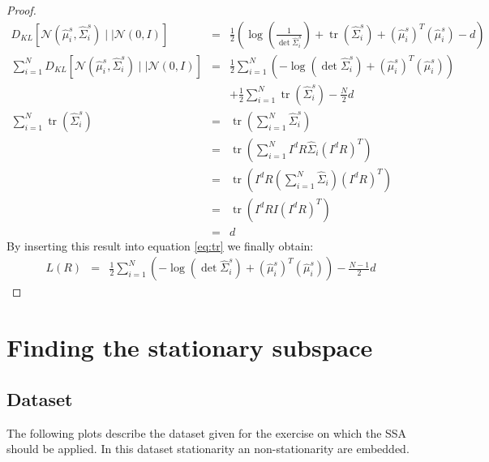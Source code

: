 \documentclass[a4paper, 12pt, titlepage]{article}
\DeclareMathOperator{\tr}{tr}
\begin{document}
\begin{proof}
	\begin{eqnarray}
		D_{KL}\left[\mathcal{N}(\hat{ \mu}_i^{s}, \hat{ \Sigma}_i^s )\mid \mid \mathcal{N}(0, I) \right] &=& \frac{1}{2} \left(\log\left( \frac{1}{\det \hat{ \Sigma}_i^s} \right) + \tr(\hat\Sigma_i^s) + (\hat\mu_i^s)^T(\hat\mu_i^s) - d \right)\\
		 \sum_{i=1}^N D_{KL}\left[\mathcal{N}(\hat{ \mu}_i^{s}, \hat{ \Sigma}_i^s )\mid \mid \mathcal{N}(0, I) \right] &=& \frac{1}{2}\sum_{i=1}^{N} \left( -\log \left( \det \hat \Sigma_i^s \right) + (\hat\mu_i^s)^T(\hat\mu_i^s) \right) \nonumber\\
		 &&+\frac{1}{2}\sum_{i=1}^N \tr(\hat \Sigma_i^s) - \frac{N}{2}d \label{eq:tr}\\
		 \sum_{i=1}^N \tr(\hat \Sigma_i^s) &=& \tr\left(\sum_{i=1}^N \hat\Sigma_i^s \right)\\
		 &=& \tr\left(\sum_{i=1}^N I^dR\hat\Sigma_i (I^dR)^T \right) \\
		 &=& \tr \left( I^dR \left( \sum_{i=1}^N \hat \Sigma_i \right) (I^dR)^T \right)\\
		 &=& \tr \left( I^dR I (I^dR)^T \right)\\
		 &=& d
	\end{eqnarray}
	By inserting this result into equation \eqref{eq:tr} we finally obtain:
	\begin{eqnarray}
		 L(R) &=& \frac{1}{2}\sum_{i=1}^{N} \left( -\log \left( \det \hat \Sigma_i^s \right) + (\hat\mu_i^s)^T(\hat\mu_i^s) \right) - \frac{N-1}{2}d
	\end{eqnarray}
\end{proof}


\newpage
\section{Finding the stationary subspace}

\subsection{Dataset}

The following plots describe the dataset given for the exercise on which the SSA should be applied. In this dataset stationarity an non-stationarity are embedded.
\end{document}
